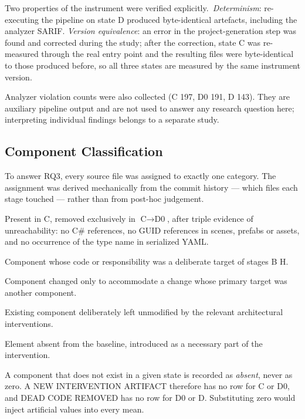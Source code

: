 \documentclass[pdflatex,sn-basic]{sn-jnl}
\begin{document}
Two properties of the instrument were verified explicitly.\ \emph{Determinism}: re-executing the pipeline on state D produced byte-identical artefacts, including the analyzer SARIF\@. \emph{Version equivalence}: an error in the project-generation step was found and corrected during the study; after the correction, state C was re-measured through the real entry point and the resulting files were byte-identical to those produced before, so all three states are measured by the same instrument version.

Analyzer violation counts were also collected (C 197, D0 191, D 143). They are auxiliary pipeline output and are not used to answer any research question here; interpreting individual findings belongs to a separate study.

\subsection{Component Classification}

To answer RQ3, every source file was assigned to exactly one category. The assignment was derived mechanically from the commit history --- which files each stage touched --- rather than from post-hoc judgement.

\begin{description}\itemsep2pt
\item[DEAD CODE REMOVED] Present in C, removed exclusively in $\text{C}\rightarrow\text{D0}$, after triple evidence of unreachability: no C\# references, no GUID references in scenes, prefabs or assets, and no occurrence of the type name in serialized YAML\@.
\item[DIRECTLY REFACTORED] Component whose code or responsibility was a deliberate target of stages B\textendash{} H.
\item[INDIRECTLY AFFECTED] Component changed only to accommodate a change whose primary target was another component.
\item[PRESERVED] Existing component deliberately left unmodified by the relevant architectural interventions.
\item[NEW INTERVENTION ARTIFACT] Element absent from the baseline, introduced as a necessary part of the intervention.
\end{description}

A component that does not exist in a given state is recorded as \emph{absent}, never as zero. A NEW INTERVENTION ARTIFACT therefore has no row for C or D0, and DEAD CODE REMOVED has no row for D0 or D. Substituting zero would inject artificial values into every mean.
\end{document}
